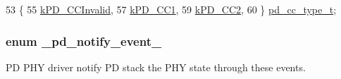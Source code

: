 \begin{DoxyCode}
53 \{
55     \hyperlink{group__usb__pd__phy__drv_ggab23c0fba94b457218944bc5284d0d08da38c70fd9b523ca5666dea46ae65119ce}{kPD\_CCInvalid},
57     \hyperlink{group__usb__pd__phy__drv_ggab23c0fba94b457218944bc5284d0d08dad8ccec791609837bd7b2cb928ba727b6}{kPD\_CC1},
59     \hyperlink{group__usb__pd__phy__drv_ggab23c0fba94b457218944bc5284d0d08da274bd8ffe2629a7d89fb09b4848e172d}{kPD\_CC2},
60 \} \hyperlink{group__usb__pd__phy__drv_ga904cdd5d0d1e7026282617a10fe8a4c9}{pd\_cc\_type\_t};
\end{DoxyCode}
\hypertarget{group__usb__pd__phy__drv_ga9e1e6534f05a5dfae46d27dbf43e0455}{
\subsubsection[{\-\_\-pd\-\_\-notify\-\_\-event\-\_\-}]{\setlength{\rightskip}{0pt plus 5cm}enum {\bf \-\_\-pd\-\_\-notify\-\_\-event\-\_\-}}}\label{group__usb__pd__phy__drv_ga9e1e6534f05a5dfae46d27dbf43e0455}


P\-D P\-H\-Y driver notify P\-D stack the P\-H\-Y state through these events. 

